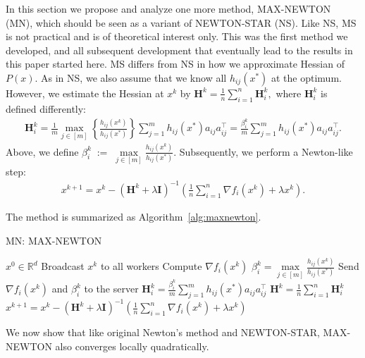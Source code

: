\documentclass[12pt]{article}
\newcommand{\eqdef}{\; { := }\;}
\newcommand{\R}{\mathbb{R}}
\newcommand{\newalpha}{h}
\newcommand{\mH}{\mathbf{H}}
\newcommand{\mI}{\mathbf{I}}
\begin{document}
In this section we propose and analyze one more method, {\sf MAX-NEWTON (MN)}, which should be seen as a variant of  {\sf NEWTON-STAR (NS)}. Like {\sf NS}, {\sf MS} is not practical and is of theoretical interest only. This was the first method we developed, and all subsequent development that eventually lead to the results in this paper started here.
{\sf MS} differs from {\sf NS} in how we approximate Hessian of $P(x)$. As in {\sf NS}, we also assume that we know all $\newalpha_{ij}(x^*)$ at the optimum. However,  we estimate the Hessian at $x^k$ by $\mH^k = \frac{1}{n}\sum\limits_{i=1}^n\mH_i^k,$ where $\mH_i^k$ is defined differently:
\begin{eqnarray*}
	\mH_i^k = \frac{1}{m}\max_{j \in [m]}\left\{\frac{\newalpha_{ij}(x^k)}{\newalpha_{ij}(x^*)}\right\}\sum\limits_{j=1}^m\newalpha_{ij}(x^*)a_{ij}a_{ij}^\top = \frac{\beta^k_i}{m}\sum\limits_{j=1}^m\newalpha_{ij}(x^*)a_{ij}a_{ij}^\top.
\end{eqnarray*}
Above, we define $\beta_i^k \eqdef \max\limits_{j \in [m]}\frac{\newalpha_{ij}(x^k)}{\newalpha_{ij}(x^*)}$. Subsequently, we perform a Newton-like  step:
\begin{eqnarray*}
	x^{k+1} = x^k - \left(\mH^k + \lambda \mI \right)^{-1}\left(\frac{1}{n}\sum\limits_{i=1}^n \nabla f_i(x^k) +\lambda x^k\right).
\end{eqnarray*}

The method is summarized as Algorithm~\ref{alg:maxnewton}.

\begin{algorithm}[h]
	\caption{{\sf MN: MAX-NEWTON}}
	\label{alg:maxnewton}
	\begin{algorithmic}
		$x^0 \in \R^d$
		\STATE Broadcast $x^k$ to all workers 
		\STATE Compute $\nabla f_i(x^k)$ 
		\STATE $\beta_i^k = \max\limits_{j \in [m]}\frac{\newalpha_{ij}(x^k)}{\newalpha_{ij}(x^*)}$ 
		\STATE Send $\nabla f_i(x^k)$ and $\beta_i^k$ to the server 
		\ENDFOR
		\STATE $\mH_i^k = \frac{\beta_i^k}{m}\sum\limits_{j=1}^m\newalpha_{ij}(x^*)a_{ij}a_{ij}^\top$
		\STATE $\mH^k = \frac{1}{n}\sum\limits_{i=1}^n \mH_i^k$
		\STATE $x^{k+1} = x^k - \left(\mH^k + \lambda \mI \right)^{-1}\left(\frac{1}{n}\sum\limits_{i=1}^n \nabla f_i(x^k)+ \lambda x^k\right)$
		\ENDFOR
	\end{algorithmic}
\end{algorithm} 

We now show that like original Newton's method and {\sf NEWTON-STAR}, {\sf MAX-NEWTON} also converges locally quadratically.
\end{document}
